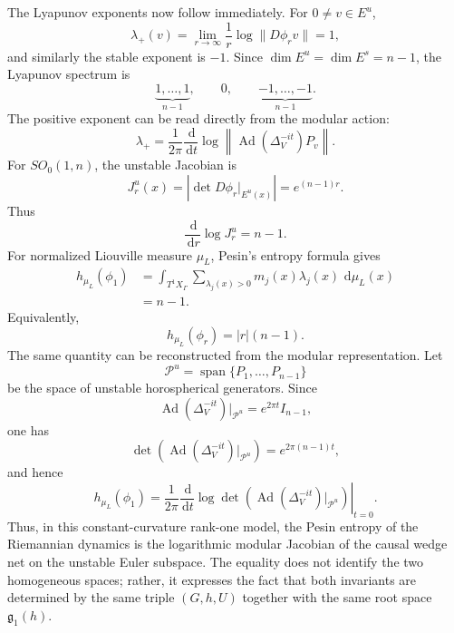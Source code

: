 \documentclass[a4paper,11pt]{article}
\theoremstyle{definition}
\newcommand{\dd}{\,\mathrm{d}}
\newcommand{\nn}{\nonumber}
\newcommand{\Ad}{\operatorname{Ad}}
\begin{document}
The Lyapunov exponents now follow immediately.  For \(0\neq v\in E^u\),
\begin{equation}
\lambda_+(v)
=
\lim_{r\to\infty}
\frac{1}{r}
\log\|D\phi_rv\|
=
1,
\end{equation}
and similarly the stable exponent is \(-1\).  Since
\(\dim E^u=\dim E^s=n-1\), the Lyapunov spectrum is
\begin{equation}
\underbrace{1,\ldots,1}_{n-1},
\qquad 0,\qquad
\underbrace{-1,\ldots,-1}_{n-1}.
\label{eq:lyapunov-spectrum}
\end{equation}
The positive exponent can be read directly from the modular action:
\begin{equation}
\lambda_+
=
\frac{1}{2\pi}
\frac{\dd}{\dd t}
\log
\left\|
\Ad(\Delta_V^{-it})P_v
\right\|.
\label{eq:modular-lyapunov}
\end{equation}
For \(SO_0(1,n)\), the unstable Jacobian is
\begin{equation}
J_r^u(x)
=
\left|
\det D\phi_r|_{E^u(x)}
\right|
=
e^{(n-1)r}.
\label{eq:unstable-jacobian}
\end{equation}
Thus
\[
\frac{\dd}{\dd r}\log J_r^u=n-1.
\]
For normalized Liouville measure \(\mu_L\), Pesin's entropy formula gives
\begin{align}
h_{\mu_L}(\phi_1)
&=
\int_{T^1X_\Gamma}
\sum_{\lambda_j(x)>0}m_j(x)\lambda_j(x)\,
\dd\mu_L(x)
\nn\\
&=
n-1.
\label{eq:pesin}
\end{align}
Equivalently,
\[
h_{\mu_L}(\phi_r)=|r|(n-1).
\]
The same quantity can be reconstructed from the modular representation.  Let
\[
\mathcal P^u
=
\operatorname{span}\{P_1,\ldots,P_{n-1}\}
\]
be the space of unstable horospherical generators.  Since
\[
\Ad(\Delta_V^{-it})|_{\mathcal P^u}
=
e^{2\pi t}I_{n-1},
\]
one has
\[
\det\left(
\Ad(\Delta_V^{-it})|_{\mathcal P^u}
\right)
=
e^{2\pi(n-1)t},
\]
and hence
\begin{equation}
h_{\mu_L}(\phi_1)
=
\frac{1}{2\pi}
\left.
\frac{\dd}{\dd t}
\log
\det\left(
\Ad(\Delta_V^{-it})|_{\mathcal P^u}
\right)
\right|_{t=0}.
\label{eq:modular-entropy}
\end{equation}
Thus, in this constant-curvature rank-one model, the Pesin entropy of the Riemannian
dynamics is the logarithmic modular Jacobian of the causal wedge net on the unstable
Euler subspace.  The equality does not identify the two homogeneous spaces; rather, it
expresses the fact that both invariants are determined by the same triple \((G,h,U)\)
together with the same root space \(\mathfrak g_1(h)\).
\end{document}
